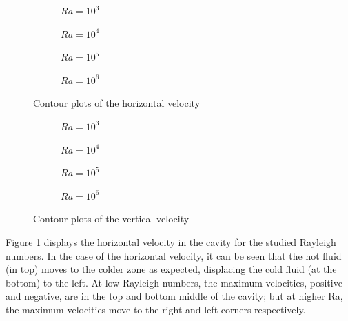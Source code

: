 \begin{figure}[h]
	\begin{subfigure}{0.5\textwidth}
		\resizebox{1.4\textwidth}{!}{}
		\caption{$Ra=10^{3}$}
	\end{subfigure}%
	\begin{subfigure}{0.5\textwidth}
		\resizebox{1.4\textwidth}{!}{}
		\caption{$Ra=10^{4}$}
	\end{subfigure}
	\begin{subfigure}{0.5\textwidth}
		\resizebox{1.4\textwidth}{!}{}
		\caption{$Ra=10^{5}$}
	\end{subfigure}%
	\begin{subfigure}{0.5\textwidth}
		\resizebox{1.4\textwidth}{!}{}
		\caption{$Ra=10^{6}$}
	\end{subfigure}
	\caption{Contour plots of the horizontal velocity}
	\label{uplotDiffHeated}
\end{figure}
\begin{figure}[h!]
	\begin{subfigure}{0.5\textwidth}
		\resizebox{1.4\textwidth}{!}{}
		\caption{$Ra=10^{3}$}
	\end{subfigure}%
	\begin{subfigure}{0.5\textwidth}
		\resizebox{1.4\textwidth}{!}{}
		\caption{$Ra=10^{4}$}
	\end{subfigure}
	\begin{subfigure}{0.5\textwidth}
		\resizebox{1.4\textwidth}{!}{}
		\caption{$Ra=10^{5}$}
		\label{vplotRa5}
	\end{subfigure}%
	\begin{subfigure}{0.5\textwidth}
		\resizebox{1.4\textwidth}{!}{}
		\caption{$Ra=10^{6}$}
		\label{vplotRa6}
	\end{subfigure}
	\caption{Contour plots of the vertical velocity}
	\label{vplotDiffHeated}
\end{figure}

Figure \ref{uplotDiffHeated} displays the horizontal velocity in the cavity for the studied Rayleigh numbers. In the case of the horizontal velocity, it can be seen that the hot fluid (in top) moves to the colder zone as expected, displacing the cold fluid (at the bottom) to the left. At low Rayleigh numbers, the maximum velocities, positive and negative, are in the top and bottom middle of the cavity; but at higher Ra, the maximum velocities move to the right and left corners respectively.

